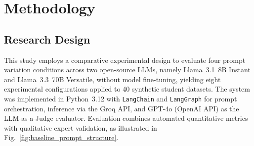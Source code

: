 \documentclass[conference,a4paper]{IEEEtran}
\begin{document}

\section{Methodology}\label{sec:methodology}

\subsection{Research Design}


This study employs a comparative experimental design
to evaluate four prompt variation conditions across two
open-source LLMs, namely Llama~3.1~8B Instant and
Llama~3.3~70B Versatile, without model fine-tuning,
yielding eight experimental configurations applied to 40
synthetic student datasets. The system was implemented in
Python~3.12 with \texttt{LangChain} and \texttt{LangGraph}
for prompt orchestration, inference via the Groq API, and
GPT-4o (OpenAI API) as the LLM-as-a-Judge
evaluator. Evaluation combines automated quantitative
metrics with qualitative expert validation, as illustrated
in Fig.~\ref{fig:baseline_prompt_structure}.
\end{document}

